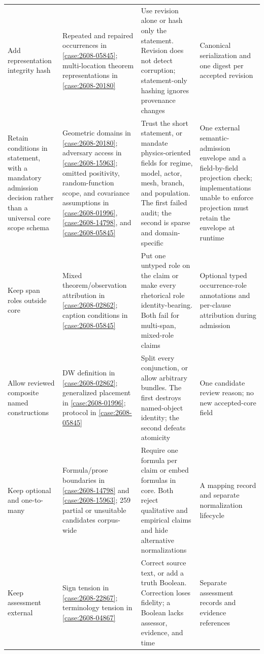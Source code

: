 \begin{longtable}{>{\raggedright\arraybackslash}p{}>{\raggedright\arraybackslash}p{}>{\raggedright\arraybackslash}p{}>{\raggedright\arraybackslash}p{}}
Add representation integrity hash & Repeated and repaired occurrences in \ref{case:2608-05845}; multi-location theorem representations in \ref{case:2608-20180} & Use revision alone or hash only the statement. Revision does not detect corruption; statement-only hashing ignores provenance changes & Canonical serialization and one digest per accepted revision \\
Retain conditions in statement, with a mandatory admission decision rather than a universal core scope schema & Geometric domains in \ref{case:2608-20180}; adversary access in \ref{case:2608-15963}; omitted positivity, random-function scope, and covariance assumptions in \ref{case:2608-01996}, \ref{case:2608-14798}, and \ref{case:2608-05845} & Trust the short statement, or mandate physics-oriented fields for regime, model, actor, mesh, branch, and population. The first failed audit; the second is sparse and domain-specific & One external semantic-admission envelope and a field-by-field projection check; implementations unable to enforce projection must retain the envelope at runtime \\
Keep span roles outside core & Mixed theorem/observation attribution in \ref{case:2608-02862}; caption conditions in \ref{case:2608-05845} & Put one untyped role on the claim or make every rhetorical role identity-bearing. Both fail for multi-span, mixed-role claims & Optional typed occurrence-role annotations and per-clause attribution during admission \\
Allow reviewed composite named constructions & DW definition in \ref{case:2608-02862}; generalized placement in \ref{case:2608-01996}; protocol in \ref{case:2608-05845} & Split every conjunction, or allow arbitrary bundles. The first destroys named-object identity; the second defeats atomicity & One candidate review reason; no new accepted-core field \\
Keep \MathClaimIR{} optional and one-to-many & Formula/prose boundaries in \ref{case:2608-14798} and \ref{case:2608-15963}; 259 partial or unsuitable candidates corpus-wide & Require one formula per claim or embed formulas in core. Both reject qualitative and empirical claims and hide alternative normalizations & A mapping record and separate normalization lifecycle \\
Keep assessment external & Sign tension in \ref{case:2608-22867}; terminology tension in \ref{case:2608-04867} & Correct source text, or add a truth Boolean. Correction loses fidelity; a Boolean lacks assessor, evidence, and time & Separate assessment records and evidence references \\
\bottomrule
\end{longtable}
\normalsize

